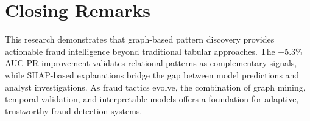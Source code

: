 \section{Closing Remarks}
\label{sec:6_5}

This research demonstrates that graph-based pattern discovery provides actionable fraud intelligence beyond traditional tabular approaches. The +5.3\% AUC-PR improvement validates relational patterns as complementary signals, while SHAP-based explanations bridge the gap between model predictions and analyst investigations. As fraud tactics evolve, the combination of graph mining, temporal validation, and interpretable models offers a foundation for adaptive, trustworthy fraud detection systems.
